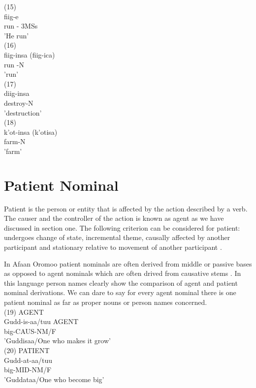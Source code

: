 \documentclass[11pt,a4paper]{article}
\begin{document}
(15)\\
\indent fiig-e \\
\indent run - 3MSs\\
\indent 'He run'\\

(16)\\
\indent fiig-insa (fiig-ica)\\
\indent run -N\\
\indent 'run'\\

(17)\\
\indent diig-insa\\
\indent destroy-N\\
\indent 'destruction'\\

(18)\\
\indent k'ot-insa (k'otisa)\\
\indent farm-N\\
\indent 'farm'\\

\section{Patient Nominal}
Patient is the person or entity that is affected by the action described by a verb. The causer and the controller of the action is known as agent as we have discussed in section one. The following criterion can be considered for patient: undergoes change of state, incremental theme, causally affected by another participant and stationary relative to movement of another participant \cite{barker1993nominal}. 

In Afaan Oromoo patient nominals are often derived from middle or passive bases as opposed to agent nominals which are often drived from causative stems \cite{tolemariam2009}. In this language person names clearly show the comparison of agent and patient nominal derivations. We can dare to say for every agent nominal there is one patient nominal as far as proper nouns or person names concerned. \\


(19) AGENT \\
\indent Gudd-is-aa/tuu  AGENT\\
\indent big-CAUS-NM/F\\
\indent 'Guddisaa/One who makes it grow'\\

(20) PATIENT\\
\indent Gudd-at-aa/tuu \\
\indent big-MID-NM/F\\
\indent 'Guddataa/One who become big'\\
\end{document}
